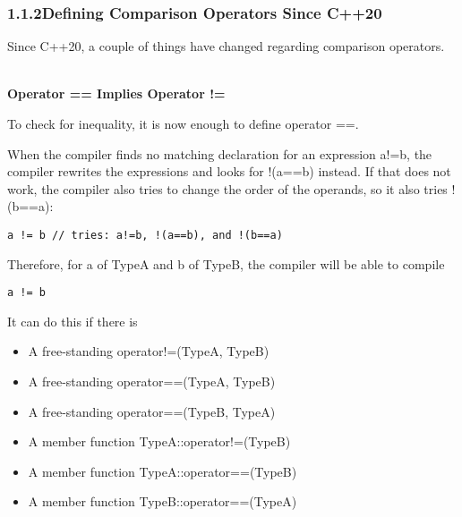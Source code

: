 \subsubsection*{ 1.1.2\hspace{0.2cm}Defining Comparison Operators Since C++20}

Since C++20, a couple of things have changed regarding comparison operators.

\noindent
\hspace*{\fill} \\ %
\textbf{Operator == Implies Operator !=}

To check for inequality, it is now enough to define operator ==.

When the compiler finds no matching declaration for an expression a!=b, the compiler rewrites the expressions and looks for !(a==b) instead. If that does not work, the compiler also tries to change the order of the operands, so it also tries !(b==a):

\begin{lstlisting}[style=styleCXX]
a != b // tries: a!=b, !(a==b), and !(b==a)
\end{lstlisting}

Therefore, for a of TypeA and b of TypeB, the compiler will be able to compile

\begin{lstlisting}[style=styleCXX]
a != b
\end{lstlisting}

It can do this if there is

\begin{itemize}
\item
A free-standing operator!=(TypeA, TypeB)

\item
A free-standing operator==(TypeA, TypeB)

\item
A free-standing operator==(TypeB, TypeA)

\item
A member function TypeA::operator!=(TypeB)

\item
A member function TypeA::operator==(TypeB)

\item
A member function TypeB::operator==(TypeA)
\end{itemize}

